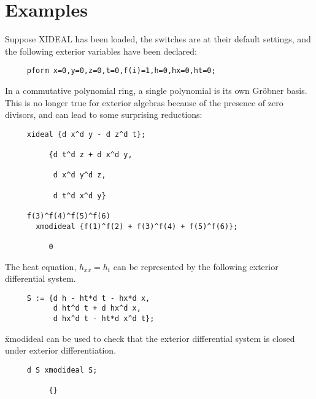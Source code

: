 
\section{Examples}

Suppose XIDEAL has been loaded, the switches are at their default settings,
and the following exterior variables have been declared:

\begin{verbatim}
     pform x=0,y=0,z=0,t=0,f(i)=1,h=0,hx=0,ht=0;
\end{verbatim}

In a commutative polynomial ring, a single polynomial is its own Gr{\"o}bner
basis. This is no longer true for exterior algebras because of the presence
of zero divisors, and can lead to some surprising reductions:
\begin{verbatim}
     xideal {d x^d y - d z^d t};

          {d t^d z + d x^d y,

           d x^d y^d z,

           d t^d x^d y}

     f(3)^f(4)^f(5)^f(6) 
       xmodideal {f(1)^f(2) + f(3)^f(4) + f(5)^f(6)};

          0
\end{verbatim}

The heat equation, $h_{xx}=h_t$ can be represented by the following
exterior differential system. 
\begin{verbatim}
     S := {d h - ht*d t - hx*d x,
           d ht^d t + d hx^d x,
           d hx^d t - ht*d x^d t};
\end{verbatim}
\f{xmodideal} can be used to check that the exterior differential system is
closed under exterior differentiation.
\begin{verbatim}
     d S xmodideal S;

          {}
\end{verbatim}

